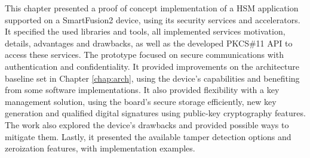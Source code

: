 This chapter presented a proof of concept implementation of a HSM application supported on a SmartFusion2 device, using its security services and accelerators. It specified the used libraries and tools, all implemented services motivation, details, advantages and drawbacks, as well as the developed PKCS\#11 API to access these services. The prototype focused on secure communications with authentication and confidentiality. It provided improvements on the architecture baseline set in Chapter \ref{chap:arch}, using the device's capabilities and benefiting from some software implementations. It also provided flexibility with a key management solution, using the board's secure storage efficiently, new key generation and qualified digital signatures using public-key cryptography features.
The work also explored the device's drawbacks and provided possible ways to mitigate them. Lastly, it presented the available tamper detection options and zeroization features, with implementation examples.

